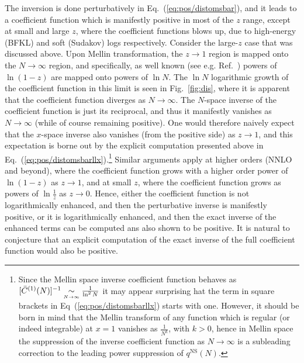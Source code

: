 The
inversion is done perturbatively in Eq.~(\ref{eq:pos/distomsbar}), and it
leads to a coefficient function which is manifestly positive in most
of the $z$ range, except at small and large $z$, where the coefficient
functions blows up, due to high-energy (BFKL) and soft (Sudakov) logs
respectively. Consider the large-$z$ case that was discussed
above. Upon 
Mellin transformation, the $z\to 1$ region is mapped onto the
$N\to\infty$ region, and specifically, as well known (see
e.g. Ref.~\cite{Forte:2002ni}) powers of $\ln(1-z)$ are mapped onto
powers of $\ln N$.  
The $\ln N$ logarithmic growth of the coefficient function in this limit is
seen in Fig.~\ref{fig:dis}, where it is apparent that the coefficient function
diverges as $N\to\infty$. The $N$-space inverse of the coefficient function is
just its reciprocal, and thus it manifestly vanishes as $N\to\infty$ (while of
course remaining positive).
One would therefore naively expect that the $x$-space inverse also vanishes
(from the positive side) as $z\to1$, and this expectation is borne out by the
explicit computation presented above in
Eq.~(\ref{eq:pos/distomsbarllx}).\footnote{
  Since the Mellin space inverse coefficient function behaves as $[\bar
  C^{(1)}(N)]^{-1}\mathrel{\mathop{\sim}\limits_{\scriptscriptstyle {N\rightarrow\infty }}}\frac{1}{\ln^2 N}$ it may appear surprising hat the
  term in square brackets in Eq~(\ref{eq:pos/distomsbarllx}) starts with one.
  However, it should be born in mind that the Mellin transform of any function
  which is regular (or indeed integrable) at $x=1$ vanishes as $\frac{1}{N^k}$,
  with $k>0$, hence in Mellin space the suppression of the inverse coefficient
  function as $N\to\infty$ is a subleading correction to the leading power
  suppression of $q^{\textrm{NS}}(N)$.
}
Similar arguments apply at higher orders (NNLO and beyond), where the
coefficient function grows with a higher order power of $\ln(1-z)$ as $z\to1$,
and at small $z$, where the coefficient function grows as powers of $\ln
\frac{1}{z}$ as $z\to0$.
Hence, either the coefficient function is not logarithmically enhanced, and
then the perturbative inverse is manifestly positive, or it is logarithmically
enhanced, and then the exact inverse of the enhanced terms can be computed ans
also shown to be positive.
It is natural to conjecture that an explicit computation of the exact inverse
of the full coefficient function would also be positive.


